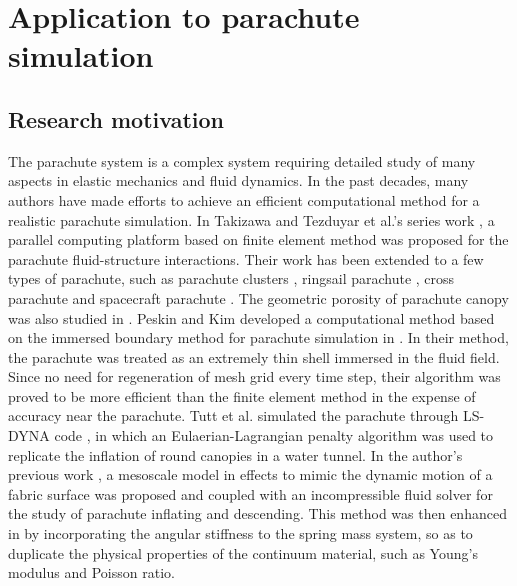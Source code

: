 \chapter{Application to parachute simulation}

\section{Research motivation}
The parachute system is a complex system requiring
detailed study of many aspects in elastic mechanics and fluid dynamics. In the
past decades, many authors have made efforts to achieve an efficient
computational method for a realistic parachute simulation.  In Takizawa and
Tezduyar et al.'s series work \cite{Stein2000,Kalro2000}, a parallel computing
platform based on finite element method was proposed for the parachute
fluid-structure interactions. Their work has been extended to a few types of
parachute, such as parachute clusters \cite{Takizawa2010}, ringsail parachute
\cite{Tezduyar2008}, cross parachute \cite{Stein2001} and spacecraft parachute
\cite{Takizawa2013}. The geometric porosity of parachute canopy was also
studied in \cite{Takizawa2013porosity}.  Peskin and Kim developed a
computational method based on the immersed boundary method for parachute
simulation in \cite{Kim2006,Kim2009}.  In their method, the parachute was
treated as an extremely thin shell immersed in the fluid field. Since no need
for regeneration of mesh grid every time step, their algorithm was proved to be
more efficient than the finite element method in the expense of accuracy near
the parachute. Tutt et al. simulated the parachute through LS-DYNA code
\cite{Tutt2005, Aquelet2007}, in which an Eulaerian-Lagrangian penalty
algorithm was used to replicate the inflation of round canopies in a water
tunnel. In the author's previous work \cite{Kim2013,Li2013}, a mesoscale model
in effects to mimic the dynamic motion of a fabric surface was proposed and
coupled with an incompressible fluid solver for the study of parachute
inflating and descending. This method was then enhanced in \cite{Shi2015} by
incorporating the angular stiffness to the spring mass system, so as to
duplicate the physical properties of the continuum material, such as Young's
modulus and Poisson ratio.

